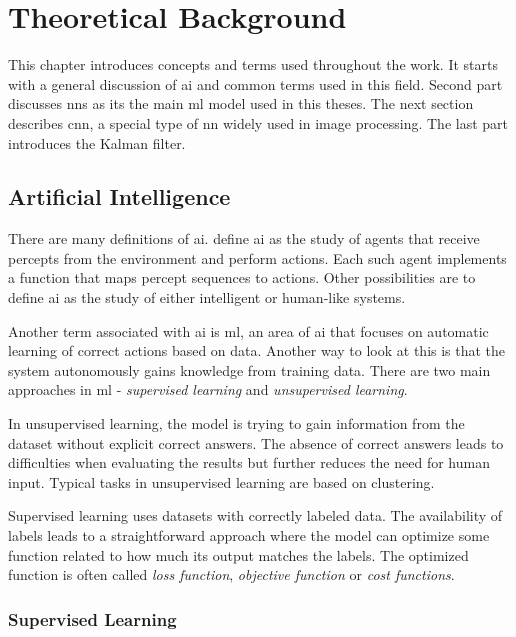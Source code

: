\chapter{Theoretical Background}\label{ch:theory}

This chapter introduces concepts and terms used throughout the work. It starts with a general discussion of \gls{ai} and common terms used in this field. Second part discusses \glspl{nn} as its the main \gls{ml} model used in this theses. The next section describes \gls{cnn}, a special type of \gls{nn} widely used in image processing. The last part introduces the Kalman filter.

\section{Artificial Intelligence}

There are many definitions of \gls{ai}. \cite{modernApproach} define \gls{ai} as the study of agents that receive percepts from the environment and perform actions. Each such agent implements a function that maps percept sequences to actions. Other possibilities are to define \gls{ai} as the study of either intelligent or human-like systems.

Another term associated with \gls{ai} is \gls{ml}, an area of \gls{ai} that focuses on automatic learning of correct actions based on data.  Another way to look at this is that the system autonomously gains knowledge from training data. There are two main approaches in \gls{ml} - \textit{supervised learning} and \textit{unsupervised learning}. 

In unsupervised learning, the model is trying to gain information from the dataset without explicit correct answers. The absence of correct answers leads to difficulties when evaluating the results but further reduces the need for human input. Typical tasks in unsupervised learning are based on clustering.

Supervised learning uses datasets with correctly labeled data. The availability of labels leads to a straightforward approach where the model can optimize some function related to how much its output matches the labels. The optimized function is often called \textit{loss function}, \textit{objective function} or \textit{cost functions}.

\subsection{Supervised Learning}

